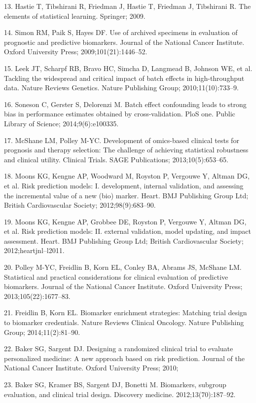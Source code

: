 \documentclass[11pt]{article}
\begin{document}
13. Hastie T, Tibshirani R, Friedman J, Hastie T, Friedman J, Tibshirani
R. The elements of statistical learning. Springer; 2009.

14. Simon RM, Paik S, Hayes DF. Use of archived specimens in evaluation
of prognostic and predictive biomarkers. Journal of the National Cancer
Institute. Oxford University Press; 2009;101(21):1446--52.

15. Leek JT, Scharpf RB, Bravo HC, Simcha D, Langmead B, Johnson WE, et
al. Tackling the widespread and critical impact of batch effects in
high-throughput data. Nature Reviews Genetics. Nature Publishing Group;
2010;11(10):733--9.

16. Soneson C, Gerster S, Delorenzi M. Batch effect confounding leads to
strong bias in performance estimates obtained by cross-validation. PloS
one. Public Library of Science; 2014;9(6):e100335.

17. McShane LM, Polley M-YC. Development of omics-based clinical tests
for prognosis and therapy selection: The challenge of achieving
statistical robustness and clinical utility. Clinical Trials. SAGE
Publications; 2013;10(5):653--65.

18. Moons KG, Kengne AP, Woodward M, Royston P, Vergouwe Y, Altman DG,
et al. Risk prediction models: I. development, internal validation, and
assessing the incremental value of a new (bio) marker. Heart. BMJ
Publishing Group Ltd; British Cardiovascular Society;
2012;98(9):683--90.

19. Moons KG, Kengne AP, Grobbee DE, Royston P, Vergouwe Y, Altman DG,
et al. Risk prediction models: II. external validation, model updating,
and impact assessment. Heart. BMJ Publishing Group Ltd; British
Cardiovascular Society; 2012;heartjnl--l2011.

20. Polley M-YC, Freidlin B, Korn EL, Conley BA, Abrams JS, McShane LM.
Statistical and practical considerations for clinical evaluation of
predictive biomarkers. Journal of the National Cancer Institute. Oxford
University Press; 2013;105(22):1677--83.

21. Freidlin B, Korn EL. Biomarker enrichment strategies: Matching trial
design to biomarker credentials. Nature Reviews Clinical Oncology.
Nature Publishing Group; 2014;11(2):81--90.

22. Baker SG, Sargent DJ. Designing a randomized clinical trial to
evaluate personalized medicine: A new approach based on risk prediction.
Journal of the National Cancer Institute. Oxford University Press; 2010;

23. Baker SG, Kramer BS, Sargent DJ, Bonetti M. Biomarkers, subgroup
evaluation, and clinical trial design. Discovery medicine.
2012;13(70):187--92.
\end{document}
